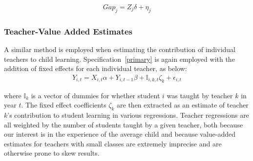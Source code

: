 \documentclass[Eubank_pk_ethnic_sorting.tex]{subfiles}
\begin{document}
\begin{eqnarray*}
	Gap_{j}=Z_{j}\delta+\eta_{j}\label{villagespecification}
\end{eqnarray*} 

\subsubsection{Teacher-Value Added Estimates}\label{}
A similar method is employed when estimating the contribution of individual teachers to child learning. Specification~\ref{primary} is again employed with the addition of fixed effects for each individual teacher, as below: 
\begin{eqnarray*}
	Y_{i,t}=X_{i,t}\alpha+Y_{i,t-1}\beta + \mathbb{I}_{i,k,t}\zeta_{k}+\epsilon_{i,t}\label{teacherspecification}
\end{eqnarray*}

where $\mathbb{I}_{k}$ is a vector of dummies for whether student $i$ was taught by teacher $k$ in year $t$. The fixed effect coefficients $\zeta_{k}$ are then extracted as an estimate of teacher $k$'s contribution to student learning in various regressions. Teacher regressions are all weighted by the number of students taught by a given teacher, both because our interest is in the experience of the average child and because value-added estimates for teachers with small classes are extremely imprecise and are otherwise prone to skew results. 

\end{document}
